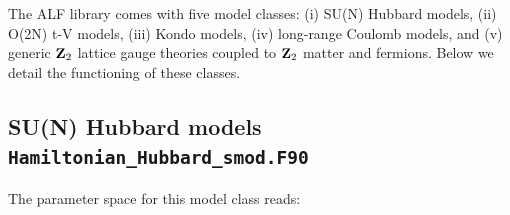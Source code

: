


The ALF  library comes with five model classes: (i) SU(N) Hubbard models, (ii) O(2N) t-V models, (iii) Kondo models, (iv) long-range Coulomb models, and (v) generic $\mathbf{Z}_{2}$ lattice gauge theories coupled to $\mathbf{Z}_{2}$ matter and fermions. Below we detail the functioning of these classes.  


\subsection{SU(N) Hubbard models \texttt{Hamiltonian\_Hubbard\_smod.F90}} \label{sec:hubbard}

The parameter space for this model class  reads: 

